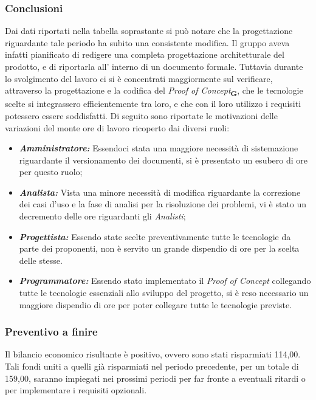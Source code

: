         \subsubsection{Conclusioni}
        Dai dati riportati nella tabella soprastante si può notare che la progettazione riguardante tale periodo ha subito una consistente modifica. Il gruppo aveva infatti pianificato di redigere una completa progettazione architetturale del prodotto, e di riportarla all’ interno di un documento formale. Tuttavia durante lo svolgimento del lavoro ci si è concentrati maggiormente sul verificare, attraverso la progettazione e la codifica del \textit{Proof of Concept}\textsubscript{\textbf{G}}, che le tecnologie scelte si integrassero efficientemente tra loro, e che con il loro utilizzo i requisiti potessero essere soddisfatti. Di seguito sono riportate le motivazioni delle variazioni del monte ore di lavoro ricoperto dai diversi ruoli:

            \begin{itemize}
                \item \textbf{\textit{Amministratore:}} Essendoci stata una maggiore necessità di sistemazione riguardante il versionamento dei documenti, si è presentato un esubero di ore per questo ruolo;
                \item \textbf{\textit{Analista:}} Vista una minore necessità di modifica riguardante la correzione dei casi d'uso e la fase di analisi per la risoluzione dei problemi, vi è stato un decremento delle ore riguardanti gli \textit{Analisti};
                \item \textbf{\textit{Progettista:}} Essendo state scelte preventivamente tutte le tecnologie da parte dei proponenti, non è servito un grande dispendio di ore per la scelta delle stesse.
                \item \textbf{\textit{Programmatore:}} Essendo stato implementato il \textit{Proof of Concept} collegando tutte le tecnologie essenziali allo sviluppo del progetto, si è reso necessario un maggiore dispendio di ore per poter collegare tutte le tecnologie previste.
            \end{itemize}

        \subsubsection{Preventivo a finire} Il bilancio economico risultante è positivo, ovvero sono stati risparmiati 114,00\EURdig. Tali fondi uniti a quelli già risparmiati nel periodo precedente, per un totale di 159,00\EurDig, saranno impiegati nei prossimi periodi per far fronte a eventuali ritardi o per implementare i requisiti opzionali.
